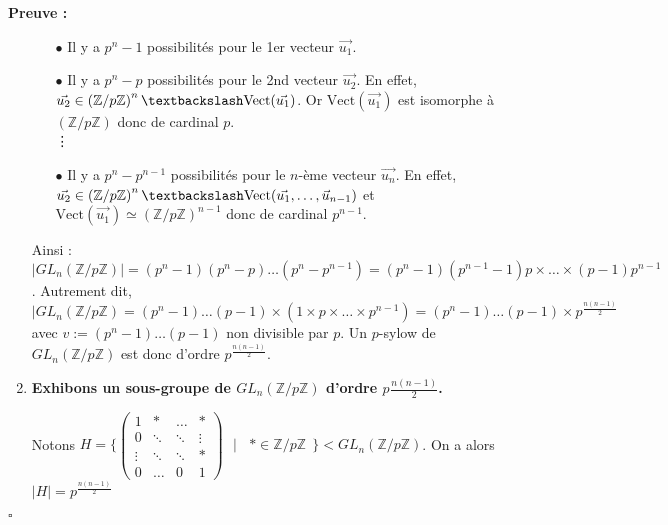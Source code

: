 \documentclass{report}
\renewenvironment{leftbar}{%
  \def\FrameCommand{\vrule width 0.4pt \hspace{10pt}}%
  \MakeFramed {\advance\hsize-\width \FrameRestore}}%
 {\endMakeFramed}%
\newenvironment{preuve}{\vspace*{0.5cm}
    \begin{leftbar}
    \noindent\textbf{Preuve :}\par}{
    \begin{flushright}
    $\square$
    \end{flushright}
    \end{leftbar}
}
\newcommand{\Z}{\mathbb{Z}}
\begin{document}
\begin{preuve}
\begin{enumerate}
            \begin{itemize}
                \item [$\bullet$]Il y a $p^n-1$ possibilités pour le 1er vecteur $\vec{u_1}.$
                \item [$\bullet$] Il y a $p^n-p$ possibilités pour le 2nd vecteur $\vec{u_2}$. En effet, $\vec{u_2} \in  \left ( \Z / p\Z \right)^n \textbackslash \text{Vect}(\vec{u_1})$. Or $\text{Vect}(\vec{u_1})$ est isomorphe à $ \left ( \Z / p\Z \right)$ donc de cardinal $p$. \\ \vdots
                \item [$\bullet$] Il y a $p^n-p^{n-1}$ possibilités pour le $n$-ème vecteur $\vec{u_n}.$ En effet, $\vec{u_2} \in  \left ( \Z / p\Z \right)^n \textbackslash \text{Vect}(\vec{u_1}, \dots, \vec{u}_{n-1})$ et $\text{Vect}(\vec{u_1}) \simeq \left ( \Z / p\Z \right)^{n-1}$ donc de cardinal $p^{n-1}$.
            \end{itemize}
            
            Ainsi : \newline $| GL_n\left( \Z / p\Z \right)| = (p^n-1)(p^n-p) \dots (p^n-p^{n-1}) = (p^n-1)(p^{n-1}-1) p \times \dots \times (p-1)p^{n-1}$. \bigbreak Autrement dit,  \newline $| GL_n\left ( \Z / p\Z \right)  = (p^n-1) \dots (p-1)\times (1\times p \times \dots \times p^{n-1}) = (p^n-1) \dots (p-1)\times p^{\tfrac{n(n-1)}{2}} $
            \newline avec $v:=(p^n-1) \dots (p-1)$ non divisible par $p$. Un $p$-sylow de $GL_n\left( \Z /p\Z \right)$ est donc d'ordre $p^{\tfrac{n(n-1)}{2}}$. \bigbreak
            
            \item \textbf{Exhibons un sous-groupe de $GL_n(\Z / p\Z)$ d'ordre $p^{}\tfrac{n(n-1)}{2}$.} \bigbreak
            
            Notons $H = \Bigg \{
            
            \begin{pmatrix}
                1 & * & \dots& *\\  
                0 & \ddots & \ddots& \vdots\\
                \vdots & \ddots & \ddots& *   \\
                0 & \dots & 0& 1
            \end{pmatrix}
            
            ~~~\Bigg |~~~~*\in \Z / p\Z~~ \Bigg \} <GL_n\left(\Z / p\Z \right)$. On a alors $|H| = p^{\tfrac{n(n-1)}{2}}$
            

\end{enumerate}
\end{preuve}
\end{document}
